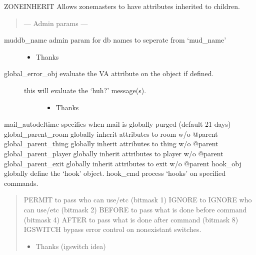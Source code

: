 \documentclass[letterpaper,10pt,english]{sphinxmanual}
\begin{document}
\sphinxAtStartPar
ZONEINHERIT \sphinxhyphen{} Allows zonemasters to have attributes inherited to children.
\begin{quote}

\sphinxAtStartPar
— Admin params —
\end{quote}
\begin{description}
\item[{muddb\_name \sphinxhyphen{} admin param for db names to seperate from ‘mud\_name’}] \leavevmode\begin{itemize}
\item {} 
\sphinxAtStartPar
Thanks 

\end{itemize}

\item[{global\_error\_obj \sphinxhyphen{} evaluate the VA attribute on the object if defined.}] \leavevmode\begin{description}
\item[{this will evaluate the ‘huh?’ message(s).}] \leavevmode\begin{itemize}
\item {} 
\sphinxAtStartPar
Thanks 

\end{itemize}

\end{description}

\end{description}

\sphinxAtStartPar
mail\_autodeltime \sphinxhyphen{} specifies when mail is globally purged (default 21 days)
global\_parent\_room \sphinxhyphen{} globally inherit attributes to room w/o @parent
global\_parent\_thing \sphinxhyphen{} globally inherit attributes to thing w/o @parent
global\_parent\_player \sphinxhyphen{} globally inherit attributes to player w/o @parent
global\_parent\_exit \sphinxhyphen{} globally inherit attributes to exit w/o @parent
hook\_obj \sphinxhyphen{} globally define the ‘hook’ object.
hook\_cmd \sphinxhyphen{} process ‘hooks’ on specified commands.
\begin{quote}

\sphinxAtStartPar
PERMIT   \sphinxhyphen{} to pass who can use/etc (bitmask 1)
IGNORE   \sphinxhyphen{} to IGNORE who can use/etc (bitmask 2)
BEFORE   \sphinxhyphen{} to pass what is done before command (bitmask 4)
AFTER    \sphinxhyphen{} to pass what is done after command (bitmask 8)
IGSWITCH \sphinxhyphen{} bypass error control on non\sphinxhyphen{}existant switches.
\begin{itemize}
\item {} 
\sphinxAtStartPar
Thanks  (igswitch idea)

\end{itemize}
\end{quote}
\end{document}
